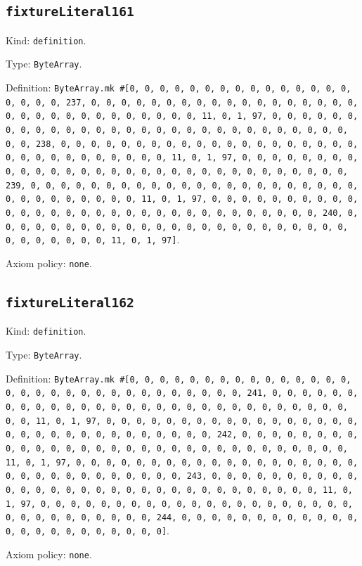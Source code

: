 \documentclass[11pt]{article}
\begin{document}
\subsection*{\texttt{fixtureLiteral161}}
\noindent Kind: \texttt{definition}.\par
\noindent Type: \texttt{ByteArray}.\par
\noindent Definition: \texttt{ByteArray.mk \#[0, 0, 0, 0, 0, 0, 0, 0, 0, 0, 0, 0, 0, 0, 0, 0, 0, 0, 0, 237, 0, 0, 0, 0, 0, 0, 0, 0, 0, 0, 0, 0, 0, 0, 0, 0, 0, 0, 0, 0, 0, 0, 0, 0, 0, 0, 0, 0, 0, 0, 0, 11, 0, 1, 97, 0, 0, 0, 0, 0, 0, 0, 0, 0, 0, 0, 0, 0, 0, 0, 0, 0, 0, 0, 0, 0, 0, 0, 0, 0, 0, 0, 0, 0, 0, 0, 238, 0, 0, 0, 0, 0, 0, 0, 0, 0, 0, 0, 0, 0, 0, 0, 0, 0, 0, 0, 0, 0, 0, 0, 0, 0, 0, 0, 0, 0, 0, 0, 11, 0, 1, 97, 0, 0, 0, 0, 0, 0, 0, 0, 0, 0, 0, 0, 0, 0, 0, 0, 0, 0, 0, 0, 0, 0, 0, 0, 0, 0, 0, 0, 0, 0, 0, 239, 0, 0, 0, 0, 0, 0, 0, 0, 0, 0, 0, 0, 0, 0, 0, 0, 0, 0, 0, 0, 0, 0, 0, 0, 0, 0, 0, 0, 0, 0, 0, 11, 0, 1, 97, 0, 0, 0, 0, 0, 0, 0, 0, 0, 0, 0, 0, 0, 0, 0, 0, 0, 0, 0, 0, 0, 0, 0, 0, 0, 0, 0, 0, 0, 0, 0, 240, 0, 0, 0, 0, 0, 0, 0, 0, 0, 0, 0, 0, 0, 0, 0, 0, 0, 0, 0, 0, 0, 0, 0, 0, 0, 0, 0, 0, 0, 0, 0, 11, 0, 1, 97]}.\par
\noindent Axiom policy: \texttt{none}.\par
\subsection*{\texttt{fixtureLiteral162}}
\noindent Kind: \texttt{definition}.\par
\noindent Type: \texttt{ByteArray}.\par
\noindent Definition: \texttt{ByteArray.mk \#[0, 0, 0, 0, 0, 0, 0, 0, 0, 0, 0, 0, 0, 0, 0, 0, 0, 0, 0, 0, 0, 0, 0, 0, 0, 0, 0, 0, 0, 0, 0, 241, 0, 0, 0, 0, 0, 0, 0, 0, 0, 0, 0, 0, 0, 0, 0, 0, 0, 0, 0, 0, 0, 0, 0, 0, 0, 0, 0, 0, 0, 0, 0, 11, 0, 1, 97, 0, 0, 0, 0, 0, 0, 0, 0, 0, 0, 0, 0, 0, 0, 0, 0, 0, 0, 0, 0, 0, 0, 0, 0, 0, 0, 0, 0, 0, 0, 0, 242, 0, 0, 0, 0, 0, 0, 0, 0, 0, 0, 0, 0, 0, 0, 0, 0, 0, 0, 0, 0, 0, 0, 0, 0, 0, 0, 0, 0, 0, 0, 0, 11, 0, 1, 97, 0, 0, 0, 0, 0, 0, 0, 0, 0, 0, 0, 0, 0, 0, 0, 0, 0, 0, 0, 0, 0, 0, 0, 0, 0, 0, 0, 0, 0, 0, 0, 243, 0, 0, 0, 0, 0, 0, 0, 0, 0, 0, 0, 0, 0, 0, 0, 0, 0, 0, 0, 0, 0, 0, 0, 0, 0, 0, 0, 0, 0, 0, 0, 11, 0, 1, 97, 0, 0, 0, 0, 0, 0, 0, 0, 0, 0, 0, 0, 0, 0, 0, 0, 0, 0, 0, 0, 0, 0, 0, 0, 0, 0, 0, 0, 0, 0, 0, 244, 0, 0, 0, 0, 0, 0, 0, 0, 0, 0, 0, 0, 0, 0, 0, 0, 0, 0, 0, 0, 0, 0, 0]}.\par
\noindent Axiom policy: \texttt{none}.\par
\end{document}
